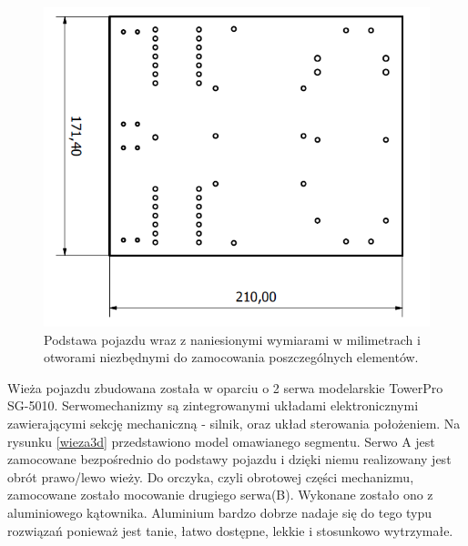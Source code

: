   \begin{figure}[H]
    \begin{center}
      \includegraphics[scale=0.55]{imgs/podstawa.png}
 	\caption[Podstawa pojazdu.]{\small{Podstawa pojazdu wraz z naniesionymi wymiarami w milimetrach i otworami niezbędnymi do zamocowania poszczególnych elementów.}}
	\label{podst3d}
    \end{center}
  \end{figure}
Wieża pojazdu zbudowana została w oparciu o 2 serwa modelarskie TowerPro SG-5010. Serwomechanizmy są zintegrowanymi układami elektronicznymi zawierającymi sekcję mechaniczną - silnik, oraz układ sterowania położeniem.
Na rysunku \ref{wieza3d} przedstawiono model omawianego segmentu. Serwo A jest zamocowane bezpośrednio do podstawy pojazdu i dzięki niemu realizowany jest obrót prawo/lewo wieży. Do orczyka, czyli obrotowej części mechanizmu, zamocowane zostało mocowanie drugiego serwa(B). Wykonane zostało ono z aluminiowego kątownika. Aluminium bardzo dobrze nadaje się do tego typu rozwiązań ponieważ jest tanie, łatwo dostępne, lekkie i stosunkowo wytrzymałe.  

